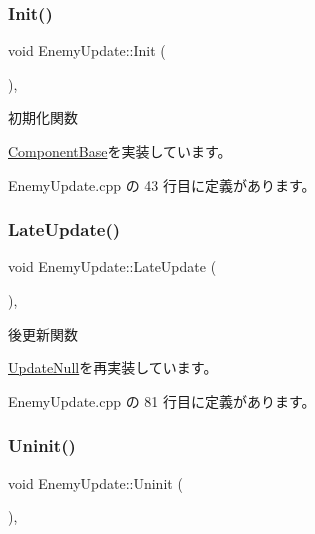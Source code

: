 \subsubsection{\texorpdfstring{Init()}{Init()}}
{\footnotesize\ttfamily void Enemy\+Update\+::\+Init (\begin{DoxyParamCaption}{ }\end{DoxyParamCaption})\hspace{0.3cm}{\ttfamily [override]}, {\ttfamily [virtual]}}



初期化関数 



\mbox{\hyperlink{class_component_base_a125939d6befe42f28886a6523e86b18b}{Component\+Base}}を実装しています。



 Enemy\+Update.\+cpp の 43 行目に定義があります。

\mbox{\label{class_enemy_update_ae14e4ebb42ad9043534e53edcba5b242}} 
\subsubsection{\texorpdfstring{Late\+Update()}{LateUpdate()}}
{\footnotesize\ttfamily void Enemy\+Update\+::\+Late\+Update (\begin{DoxyParamCaption}{ }\end{DoxyParamCaption})\hspace{0.3cm}{\ttfamily [override]}, {\ttfamily [virtual]}}



後更新関数 



\mbox{\hyperlink{class_update_null_ac68da1ba7f3fbcae833442bb1c169200}{Update\+Null}}を再実装しています。



 Enemy\+Update.\+cpp の 81 行目に定義があります。

\mbox{\label{class_enemy_update_a294a5d4c65551af43e933cb65036f279}} 
\subsubsection{\texorpdfstring{Uninit()}{Uninit()}}
{\footnotesize\ttfamily void Enemy\+Update\+::\+Uninit (\begin{DoxyParamCaption}{ }\end{DoxyParamCaption})\hspace{0.3cm}{\ttfamily [override]}, {\ttfamily [virtual]}}



